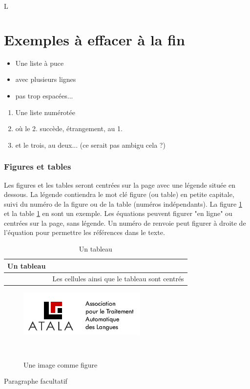 \documentclass[10pt,a4paper,twoside]{article}
\begin{document}
L

\section{Exemples à effacer à la fin}

\begin{itemize}
\item Une liste à puce
\item avec plusieurs lignes
\item pas trop espacées... 
\end{itemize}

\begin{enumerate}
\item Une liste numérotée
\item où le 2. succède, étrangement, au 1.
\item et le trois, au deux... (ce serait pas ambigu cela ?)
\end{enumerate}

\subsubsection{Figures et tables}

Les figures et les tables seront centrées sur la page avec une légende située en dessous. La légende contiendra le mot clé figure (ou table) en petite capitale, suivi du numéro de la figure ou de la table (numéros indépendants). La figure \ref{image} et la table \ref{table} en sont un exemple. Les équations peuvent figurer "en ligne" ou centrées sur la page, sans légende. Un numéro de renvoie peut figurer à droite de l'équation pour permettre les références dans le texte.

\begin{table}[!h]
\centering
	\begin{tabular}{|c|p{4cm}|}
	\hline
	Un tableau&\\
	\hline
	&Les cellules ainsi que le tableau sont centrés\\
	\hline
	\end{tabular}
\caption{Un tableau}\label{table}
\end{table}

\begin{figure}[htbp] 
\begin{center} 
\includegraphics{images/atala.png}
\end{center} 
\caption{Une image comme figure} \label{image} \
\end{figure}
Paragraphe facultatif





\end{document}
